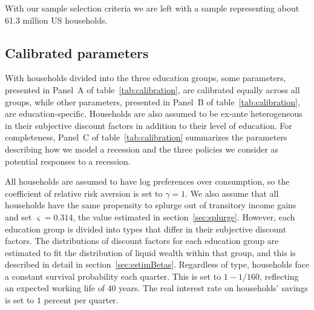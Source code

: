 \documentclass[../HAFiscal]{subfiles}
\begin{document}
With our sample selection criteria we are left with a sample representing about 61.3 million US households.

\subsection{Calibrated parameters} 
\label{sec:calib}

With households divided into the three education groups, some parameters, presented in Panel~A of table~\ref{tab:calibration}, are calibrated equally across all groups, while other parameters, presented in Panel~B of table~\ref{tab:calibration}, are education-specific.  Households are also assumed to be ex-ante heterogeneous in their subjective discount factors in addition to their level of education. For completeness, Panel~C of table~\ref{tab:calibration} summarizes the parameters describing how we model a recession and the three policies we consider as potential responses to a recession. 

All households are assumed to have log preferences over consumption, so the coefficient of relative risk aversion is set to $\gamma=1$. We also assume that all households have the same propensity to splurge out of transitory income gains and set $\varsigma=0.314$, the value estimated in section~\ref{sec:splurge}. However, each education group is divided into types that differ in their subjective discount factors. The distributions of discount factors for each education group are estimated to fit the distribution of liquid wealth within that group, and this is described in detail in section~\ref{sec:estimBetas}. Regardless of type, households face a constant survival probability each quarter. This is set to $1-1/160$, reflecting an expected working life of 40 years. The real interest rate on households' savings is set to $1$ percent per quarter. 
\end{document}
